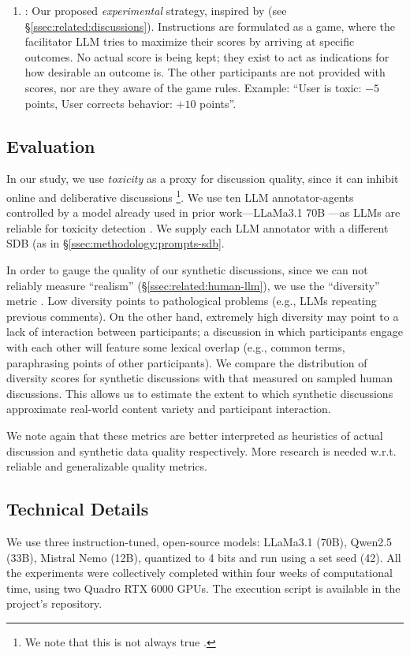 \begin{enumerate}
	\item \textbf{\strategymodgame}: Our proposed \emph{experimental} strategy, inspired by \citet{abdelnabi_negotiations} (see \S\ref{ssec:related:discussions}). Instructions are formulated as a game, where the facilitator LLM tries to maximize their scores by arriving at specific outcomes. No actual score is being kept; they exist to act as indications for how desirable an outcome is. The other participants are not provided with scores, nor are they aware of the game rules. Example: ``User is toxic: $-5$ points, User corrects behavior: $+10$ points''.
\end{enumerate}



\subsection{Evaluation}
\label{ssec:experimental:evaluation}

In our study, we use \emph{toxicity} as a proxy for discussion quality, since it can inhibit online and deliberative discussions \citep{dekock2022disagree, XiaToxicity}\footnote{We note that this is not always true \citep{Avalle2024PersistentIP}.}. We use ten LLM annotator-agents controlled by a model already used in prior work---LLaMa3.1 70B \citep{kang-qian-2024-implanting}---as LLMs are reliable for toxicity detection \citep{kang-qian-2024-implanting, Wang2022ToxicityDW, anjum2024hate}. We supply each LLM annotator with a different SDB (as in \S\ref{ssec:methodology:prompts-sdb}.

In order to gauge the quality of our synthetic discussions, since we can not reliably measure ``realism'' (\S\ref{ssec:related:human-llm}), we use the ``diversity'' metric \citep{ulmer2024}. Low diversity points to pathological problems (e.g., LLMs repeating previous comments). On the other hand, extremely high diversity may point to a lack of interaction between participants; a discussion in which participants engage with each other will feature some lexical overlap (e.g., common terms, paraphrasing points of other participants). We compare the distribution of diversity scores for synthetic discussions with that measured on sampled human discussions. This allows us to estimate the extent to which synthetic discussions approximate real-world content variety and participant interaction. 

We note again that these metrics are better interpreted as heuristics of actual discussion and synthetic data quality respectively. More research is needed w.r.t. reliable and generalizable quality metrics.


\subsection{Technical Details}
\label{ssec:experimental:setup}

We use three instruction-tuned, open-source models: LLaMa3.1 (70B), Qwen2.5 (33B),  Mistral Nemo (12B), quantized to 4 bits and run using a set seed (42). All the experiments were collectively completed within four weeks of computational time, using two Quadro RTX 6000 GPUs. The execution script is available in the project's repository.\analysislink 